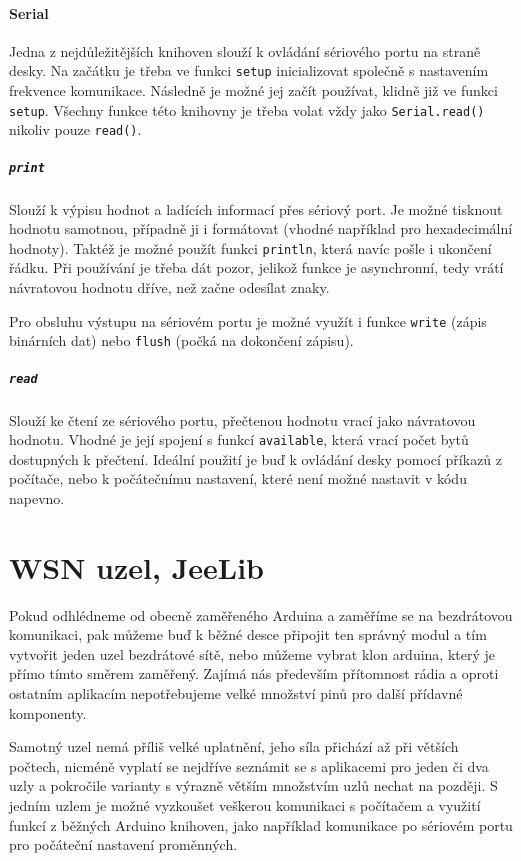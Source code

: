 \documentclass[12pt,titlepage]{article}
\begin{document}
		\paragraph{Serial}
			Jedna z nejdůležitějších knihoven slouží k ovládání sériového portu na straně desky. Na začátku je třeba ve funkci \texttt{setup} inicializovat společně s nastavením frekvence komunikace. Následně je možné jej začít používat, klidně již ve funkci \texttt{setup}. Všechny funkce této knihovny je třeba volat vždy jako \texttt{Serial.read()} nikoliv pouze \texttt{read()}.

			\subparagraph{\texttt{print}}
				Slouží k výpisu hodnot a ladících informací přes sériový port. Je možné tisknout hodnotu samotnou, případně ji i formátovat (vhodné například pro hexadecimální hodnoty). Taktéž je možné použít funkci \texttt{println}, která navíc pošle i ukončení řádku. Při používání je třeba dát pozor, jelikož funkce je
				asynchronní, tedy vrátí návratovou hodnotu dříve, než začne odesílat znaky.

				Pro obsluhu výstupu na sériovém portu je možné využít i funkce \texttt{write} (zápis binárních dat) nebo \texttt{flush} (počká na dokončení zápisu).

			\subparagraph{\texttt{read}}
				Slouží ke čtení ze sériového portu, přečtenou hodnotu vrací jako návratovou hodnotu. Vhodné je její spojení s funkcí \texttt{available}, která vrací počet bytů dostupných k přečtení. Ideální použití je buď k ovládání desky pomocí příkazů z počítače, nebo k počátečnímu nastavení, které není možné nastavit v kódu napevno.

\section{WSN uzel, JeeLib}

	Pokud odhlédneme od obecně zaměřeného Arduina a zaměříme se na bezdrátovou komunikaci, pak můžeme buď k běžné desce připojit ten správný modul a tím vytvořit jeden uzel bezdrátové sítě, nebo můžeme vybrat klon arduina, který je přímo tímto směrem zaměřený. Zajímá nás především přítomnost rádia a oproti ostatním aplikacím nepotřebujeme velké množství pinů pro další přídavné komponenty.

	Samotný uzel nemá příliš velké uplatnění, jeho síla přichází až při větších počtech, nicméně vyplatí se nejdříve seznámit se s aplikacemi pro jeden či dva uzly a pokročile varianty s výrazně větším množstvím uzlů nechat na později. S jedním uzlem je možné vyzkoušet veškerou komunikaci s počítačem a využití funkcí z běžných Arduino knihoven, jako například komunikace po sériovém portu pro počáteční nastavení proměnných.
\end{document}
